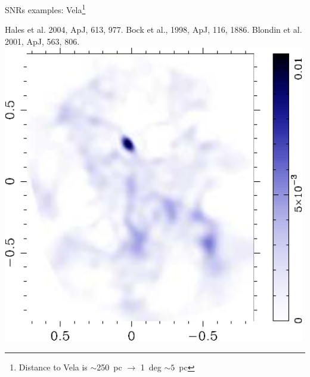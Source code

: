 \begin{frame}{SNRs examples:
  Vela\footnote{Distance to Vela is $\sim$250~pc $\rightarrow$ 1~deg
    $\sim 5$~pc }}

\begin{minipage}[t]{0.39\textwidth}
\vspace{-6cm}
{\small Hales et al. 2004, ApJ, 613, 977. Bock et al., 1998, ApJ, 116, 1886. Blondin et al. 2001, ApJ, 563, 806. }
\includegraphics[width=0.99\textwidth,height=!]{./E/vela_CBI.pdf}
\end{minipage}
\begin{minipage}[t]{0.59\textwidth}
\begin{center}

\end{center}
\end{minipage}
\end{frame}
